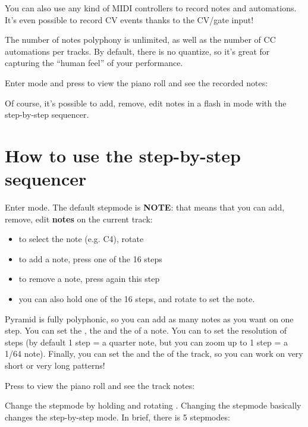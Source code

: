 You can also use any kind of MIDI controllers to record notes and automations. It's even possible to record CV events thanks to the CV/gate input!

The number of notes polyphony is unlimited, as well as the number of CC automations per tracks. By default, there is no quantize, so it's great for capturing the ``human feel'' of your performance.

Enter  mode and press  to view the piano roll and see the recorded notes:


Of course, it's possible to add, remove, edit notes in a flash in  mode with the step-by-step sequencer.


\section{How to use the step-by-step sequencer}

Enter  mode. The default stepmode is \textbf{NOTE}: that means that you can add, remove, edit \textbf{notes} on the current track:

\begin{itemize}
\item to select the note (e.g. C4), rotate \encodericon{}
\item to add a note, press one of the 16 steps \padsicon{}
\item to remove a note, press again this step \padsicon{}
\item you can also hold one of the 16 steps, and rotate \encodericon{} to set the note.
\end{itemize}

Pyramid is fully polyphonic, so you can add as many notes as you want on one step. You can set the , the  and the  of a note. You can  to set the resolution of steps (by default 1 step = a quarter note, but you can zoom up to 1 step = a 1/64 note). Finally, you can set the  and the  of the track, so you can work on very short or very long patterns!

Press  to view the piano roll and see the track notes:


Change the stepmode by holding  and rotating \encodericon{}. Changing the stepmode basically changes the step-by-step mode. In brief, there is 5 stepmodes:

